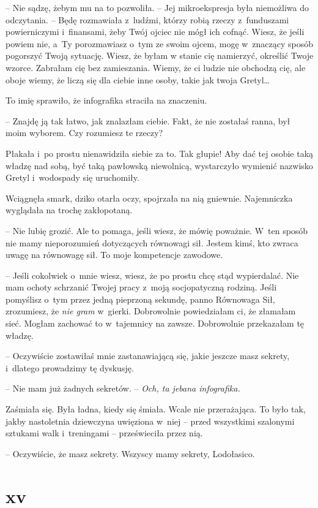 \documentclass[oneside,polish,11pt,sfheadings]{mwbk}
\begin{document}
-- Nie sądzę, żebym mu na to pozwoliła. -- Jej mikroekspresja była
niemożliwa do odczytania. -- Będę rozmawiała z~ludźmi, którzy robią
rzeczy z~funduszami powierniczymi i~finansami, żeby Twój ojciec nie mógł
ich cofnąć. Wiesz, że jeśli powiem nie, a~Ty porozmawiasz o~tym ze swoim
ojcem, mogę w~znaczący sposób pogorszyć Twoją sytuację. Wiesz, że byłam
w stanie cię namierzyć, określić Twoje wzorce. Zabrałam cię bez
zamieszania. Wiemy, że ci ludzie nie obchodzą cię, ale oboje wiemy, że
liczą się dla ciebie inne osoby, takie jak twoja Gretyl\ldots  

To imię
sprawiło, że infografika straciła na znaczeniu. 

-- Znajdę ją tak łatwo,
jak znalazłam ciebie. Fakt, że nie zostałaś ranna, był moim wyborem. Czy
rozumiesz te rzeczy?

Płakała i~po prostu nienawidziła siebie za to. Tak głupie! Aby dać tej
osobie taką władzę nad sobą, być taką pawłowską niewolnicą, wystarczyło
wymienić nazwisko Gretyl i~wodospady się uruchomiły.

Wciągnęła smark, dziko otarła oczy, spojrzała na nią gniewnie.
Najemniczka wyglądała na trochę zakłopotaną.

-- Nie lubię grozić. Ale to pomaga, jeśli wiesz, że mówię poważnie. W~ten
sposób nie mamy nieporozumień dotyczących równowagi sił. Jestem kimś,
kto zwraca uwagę na równowagę sił. To moje kompetencje zawodowe.

-- Jeśli cokolwiek o~mnie wiesz, wiesz, że po prostu chcę stąd
wypierdalać. Nie mam ochoty schrzanić Twojej pracy z~moją socjopatyczną
rodziną. Jeśli pomyślisz o~tym przez jedną pieprzoną sekundę, panno
Równowaga Sił, zrozumiesz, że \textit{nie gram} w~gierki. Dobrowolnie
powiedziałam ci, że złamałam sieć. Mogłam zachować to w~tajemnicy na
zawsze. Dobrowolnie przekazałam tę władzę.

-- Oczywiście zostawiłaś mnie zastanawiającą się, jakie jeszcze masz
sekrety, i~dlatego prowadzimy tę dyskusję.

-- Nie mam już żadnych sekretów. -- \textit{Och, ta jebana infografika.}

Zaśmiała się. Była ładna, kiedy się śmiała. Wcale nie przerażająca. To
było tak, jakby nastoletnia dziewczyna uwięziona w~niej -- przed
wszystkimi szalonymi sztukami walk i~treningami -- prześwieciła przez
nią. 

-- Oczywiście, że masz sekrety. Wszyscy mamy sekrety, Lodołasico.


\chapter*{xv}
\end{document}
